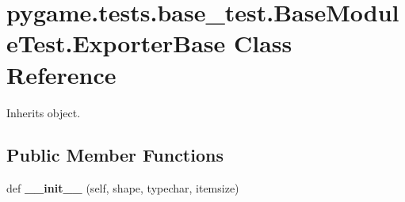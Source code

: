 \hypertarget{classpygame_1_1tests_1_1base__test_1_1_base_module_test_1_1_exporter_base}{}\section{pygame.\+tests.\+base\+\_\+test.\+Base\+Module\+Test.\+Exporter\+Base Class Reference}
\label{classpygame_1_1tests_1_1base__test_1_1_base_module_test_1_1_exporter_base}


Inherits object.

\subsection*{Public Member Functions}
\begin{DoxyCompactItemize}
\item 
\mbox{\label{classpygame_1_1tests_1_1base__test_1_1_base_module_test_1_1_exporter_base_a06c553c5602cb47b23de3f32328467b5}} 
def {\bfseries \+\_\+\+\_\+init\+\_\+\+\_\+} (self, shape, typechar, itemsize)
\end{DoxyCompactItemize}
